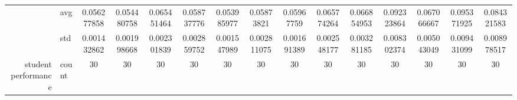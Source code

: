 \begin{table}[H]
{\begin{tabular}{rlccc|c|c|c|c|c|ccccc}
			                                                                               & avg                & \cellcolor[rgb]{ .51,  .776,  .486}0.056277858                                 & \cellcolor[rgb]{ .412,  .749,  .482}0.054480758                                & \cellcolor[rgb]{ 1,  .922,  .518}0.065451464                                   & \cellcolor[rgb]{ .639,  .816,  .494}0.058737776 & \cellcolor[rgb]{ .388,  .745,  .482}\textcolor[rgb]{ 0,  .38,  0}{0.053985977} & \cellcolor[rgb]{ .639,  .816,  .494}0.05873821  & \cellcolor[rgb]{ .69,  .831,  .498}0.05967759                                  & \cellcolor[rgb]{ 1,  .918,  .518}0.065774264    & \cellcolor[rgb]{ 1,  .898,  .514}0.066854953    & \cellcolor[rgb]{ .976,  .467,  .431}0.092323864 & \cellcolor[rgb]{ 1,  .894,  .514}0.067066667    & \cellcolor[rgb]{ .973,  .412,  .42}0.095371925  & \cellcolor[rgb]{ .984,  .604,  .459}0.084321583 \\
			                                                                               & std                & 0.001432862                                                                    & 0.001998668                                                                    & 0.002301839                                                                    & 0.002859752                                     & 0.001547989                                                                    & 0.002811075                                     & 0.001691389                                                                    & 0.002548177                                     & 0.003281185                                     & 0.008302374                                     & 0.005043049                                     & 0.009431099                                     & 0.008978517                                     \\
			student performance                                                            & count              & 30                                                                             & 30                                                                             & 30                                                                             & 30                                              & 30                                                                             & 30                                              & 30                                                                             & 30                                              & 30                                              & 30                                              & 30                                              & 30                                              & 30                                              \\

\end{tabular}}
\end{table}
